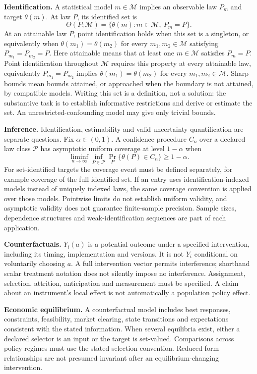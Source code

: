 \documentclass[11pt,a4paper]{article}
\begin{document}
\textbf{Identification.} A statistical model $m\in\mathcal M$ implies an observable law $P_m$ and target $\theta(m)$. At law $P$, its identified set is
\[
\Theta(P;\mathcal M)=\{\theta(m):m\in\mathcal M,\ P_m=P\}.
\]
At an attainable law $P$, point identification holds when this set is a singleton, or equivalently when $\theta(m_1)=\theta(m_2)$ for every $m_1,m_2\in\mathcal M$ satisfying $P_{m_1}=P_{m_2}=P$. Here attainable means that at least one $m\in\mathcal M$ satisfies $P_m=P$. Point identification throughout $\mathcal M$ requires this property at every attainable law, equivalently $P_{m_1}=P_{m_2}$ implies $\theta(m_1)=\theta(m_2)$ for every $m_1,m_2\in\mathcal M$. Sharp bounds mean bounds attained, or approached when the boundary is not attained, by compatible models. Writing this set is a definition, not a solution: the substantive task is to establish informative restrictions and derive or estimate the set. An unrestricted-confounding model may give only trivial bounds.

\textbf{Inference.} Identification, estimability and valid uncertainty quantification are separate questions. Fix $\alpha\in(0,1)$. A confidence procedure $C_n$ over a declared law class $\mathcal P$ has asymptotic uniform coverage at level $1-\alpha$ when
\[
\liminf_{n\to\infty}\inf_{P\in\mathcal P}\Pr_P\{\theta(P)\in C_n\}\geq1-\alpha.
\]
For set-identified targets the coverage event must be defined separately, for example coverage of the full identified set. If an entry uses identification-indexed models instead of uniquely indexed laws, the same coverage convention is applied over those models. Pointwise limits do not establish uniform validity, and asymptotic validity does not guarantee finite-sample precision. Sample sizes, dependence structures and weak-identification sequences are part of each application.

\textbf{Counterfactuals.} $Y_i(a)$ is a potential outcome under a specified intervention, including its timing, implementation and versions. It is not $Y_i$ conditional on voluntarily choosing $a$. A full intervention vector permits interference; shorthand scalar treatment notation does not silently impose no interference. Assignment, selection, attrition, anticipation and measurement must be specified. A claim about an instrument's local effect is not automatically a population policy effect.

\textbf{Economic equilibrium.} A counterfactual model includes best responses, constraints, feasibility, market clearing, state transitions and expectations consistent with the stated information. When several equilibria exist, either a declared selector is an input or the target is set-valued. Comparisons across policy regimes must use the stated selection convention. Reduced-form relationships are not presumed invariant after an equilibrium-changing intervention.
\end{document}
